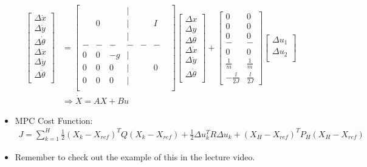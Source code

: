 \begin{itemize}
    \begin{align}
        \begin{bmatrix}
            \Delta \dot x \\
            \Delta \dot y \\
            \Delta \dot \theta \\
            \Delta \ddot x \\
            \Delta \ddot y \\
            \Delta \ddot \theta \\
        \end{bmatrix} &= 
        \begin{bmatrix}
             &  &  & | &  &  &  \\
             & 0&  & | &  & I&  \\
             &  &  & | &  &  &  \\
            - & - & - & - & - & - \\
            0& 0& -g& | & & &  \\
            0& 0& 0& | & & 0&  \\
            0& 0& 0& | & & &  \\
        \end{bmatrix}
        \begin{bmatrix}
            \Delta  x \\
            \Delta  y \\
            \Delta \theta \\
            \Delta \dot x \\
            \Delta \dot y \\
            \Delta \dot \theta \\
        \end{bmatrix} + 
        \begin{bmatrix}
            0 & 0 \\
            0 & 0 \\
            0 & 0 \\
            - & - \\
            0 & 0 \\
            \frac{1}{m} & \frac{1}{m} \\
            -\frac{l}{2J} &\frac{l}{2J} 
        \end{bmatrix}
        \begin{bmatrix}
            \Delta  u_1 \\
            \Delta  u_2 \\
        \end{bmatrix} \\
        & \Rightarrow \dot X = AX + Bu
    \end{align}

    \item MPC Cost Function: 
    \begin{align}
        J = \sum_{k = 1}^H \frac{1}{2} (X_k - X_{ref})^T Q (X_k - X_{ref}) + \frac{1}{2} \Delta u_k^T R \Delta u_k + (X_H - X_{ref})^T P_H (X_H - X_{ref})
    \end{align}

    \item Remember to check out the example of this in the lecture video.
\end{itemize}
